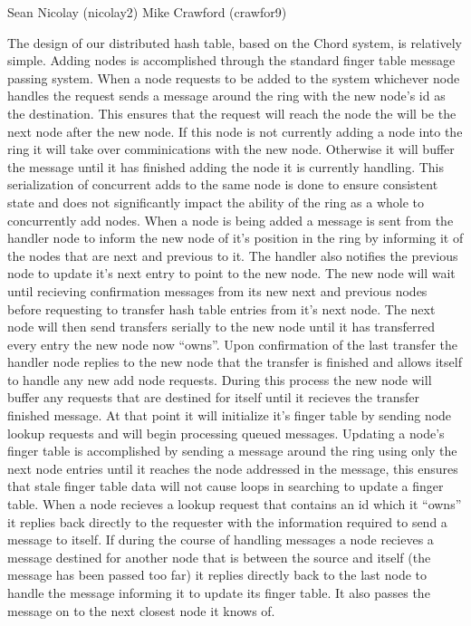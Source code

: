 Sean Nicolay (nicolay2)
Mike Crawford (crawfor9)

The design of our distributed hash table, based on the Chord system, is relatively simple. Adding nodes is accomplished through the standard finger table message passing system. When a node requests to be added to the system whichever node handles the request sends a message around the ring with the new node's id as the destination. This ensures that the request will reach the node the will be the next node after the new node. If this node is not currently adding a node into the ring it will take over comminications with the new node. Otherwise it will buffer the message until it has finished adding the node it is currently handling. This serialization of concurrent adds to the same node is done to ensure consistent state and does not significantly impact the ability of the ring as a whole to concurrently add nodes. When a node is being added a message is sent from the handler node to inform the new node of it's position in the ring by informing it of the nodes that are next and previous to it. The handler also notifies the previous node to update it's next entry to point to the new node. The new node will wait until recieving confirmation messages from its new next and previous nodes before requesting to transfer hash table entries from it's next node. The next node will then send transfers serially to the new node until it has transferred every entry the new node now ``owns''. Upon confirmation of the last transfer the handler node replies to the new node that the transfer is finished and allows itself to handle any new add node requests. During this process the new node will buffer any requests that are destined for itself until it recieves the transfer finished message. At that point it will initialize it's finger table by sending node lookup requests and will begin processing queued messages.
Updating a node's finger table is accomplished by sending a message around the ring using only the next node entries until it reaches the node addressed in the message, this ensures that stale finger table data will not cause loops in searching to update a finger table. When a node recieves a lookup request that contains an id which it ``owns'' it replies back directly to the requester with the information required to send a message to itself. If during the course of handling messages a node recieves a message destined for another node that is between the source and itself (the message has been passed too far) it replies directly back to the last node to handle the message informing it to update its finger table. It also passes the message on to the next closest node it knows of.
